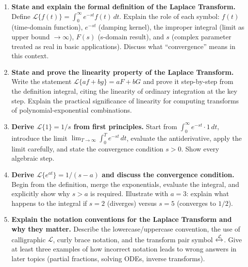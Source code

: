 \documentclass[12pt,a4paper]{article}
\begin{document}
\begin{enumerate}[leftmargin=1.5cm, label=\textbf{D\arabic*.}]

  \item \textbf{State and explain the formal definition of the Laplace
        Transform.}
  Define $\mathcal{L}\{f(t)\} = \int_0^\infty e^{-st} f(t)\, dt$.
  Explain the role of each symbol: $f(t)$ (time-domain function), $e^{-st}$
  (damping kernel), the improper integral (limit as upper bound $\to \infty$),
  $F(s)$ (s-domain result), and $s$ (complex parameter treated as real in
  basic applications). Discuss what ``convergence'' means in this context.

  \item \textbf{State and prove the linearity property of the Laplace
        Transform.}
  Write the statement $\mathcal{L}\{af + bg\} = aF + bG$ and prove it
  step-by-step from the definition integral, citing the linearity of ordinary
  integration at the key step. Explain the practical significance of linearity
  for computing transforms of polynomial-exponential combinations.

  \item \textbf{Derive $\mathcal{L}\{1\} = 1/s$ from first principles.}
  Start from $\int_0^\infty e^{-st} \cdot 1\, dt$, introduce the limit
  $\lim_{T \to \infty} \int_0^T e^{-st}\, dt$, evaluate the antiderivative,
  apply the limit carefully, and state the convergence condition $s > 0$.
  Show every algebraic step.

  \item \textbf{Derive $\mathcal{L}\{e^{at}\} = 1/(s-a)$ and discuss the
        convergence condition.}
  Begin from the definition, merge the exponentials, evaluate the integral,
  and explicitly show why $s > a$ is required. Illustrate with $a = 3$:
  explain what happens to the integral if $s = 2$ (diverges) versus $s = 5$
  (converges to $1/2$).

  \item \textbf{Explain the notation conventions for the Laplace Transform
        and why they matter.}
  Describe the lowercase/uppercase convention, the use of calligraphic
  $\mathcal{L}$, curly brace notation, and the transform pair symbol
  $\xleftrightarrow{\mathcal{L}}$. Give at least three examples of how
  incorrect notation leads to wrong answers in later topics (partial fractions,
  solving ODEs, inverse transforms).

\end{enumerate}

\end{document}
